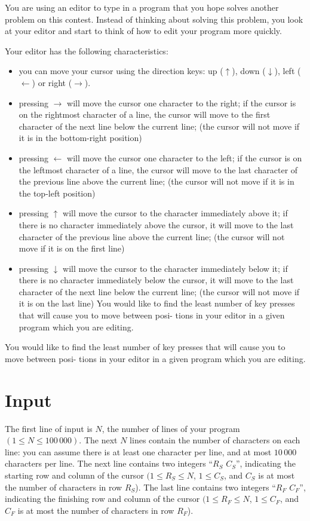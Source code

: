 You are using an editor to type in a program that you hope solves another problem on this contest.
Instead of thinking about solving this problem, you look at your editor and start to think of how to
edit your program more quickly.

Your editor has the following characteristics:
\begin{itemize}
  \item you can move your cursor using the direction keys: up ($\uparrow$), down ($\downarrow$),
  left ($\leftarrow$) or right ($\rightarrow$).

  \item pressing $\rightarrow$ will move the cursor one character to the right; if the cursor is on
  the rightmost character of a line, the cursor will move to the first character of the next line
  below the current line; (the cursor will not move if it is in the bottom-right position)

  \item pressing $\leftarrow$ will move the cursor one character to the left; if the cursor is on
  the leftmost character of a line, the cursor will move to the last character of the previous
  line above the current line; (the cursor will not move if it is in the top-left position)

  \item pressing $\uparrow$ will move the cursor to the character immediately above it; if there is
  no character immediately above the cursor, it will move to the last character of the previous
  line above the current line; (the cursor will not move if it is on the first line)

  \item pressing $\downarrow$ will move the cursor to the character immediately below it; if there
  is no character immediately below the cursor, it will move to the last character of the next
  line below the current line; (the cursor will not move if it is on the last line) You would like
  to find the least number of key presses that will cause you to move between posi- tions in your
  editor in a given program which you are editing.
\end{itemize}

You would like to find the least number of key presses that will cause you to move between posi-
tions in your editor in a given program which you are editing.

\section*{Input}
The first line of input is $N$, the number of lines of your program $(1 \leq N \leq 100\,000)$. The
next $N$ lines contain the number of characters on each line: you can assume there is at least one
character per line, and at most $10\,000$ characters per line. The next line contains two integers
``$R_S$ $C_S$'', indicating the starting row and column of the cursor $(1 \leq R_S \leq N$, $1 \leq
C_S$, and $C_S$ is at most the number of characters in row $R_S$). The last line contains two integers
``$R_F$ $C_F$'', indicating the finishing row and column of the cursor $(1 \leq R_F \leq N$, $1
\leq C_F$, and $C_F$ is at most the number of characters in row $R_F$).

